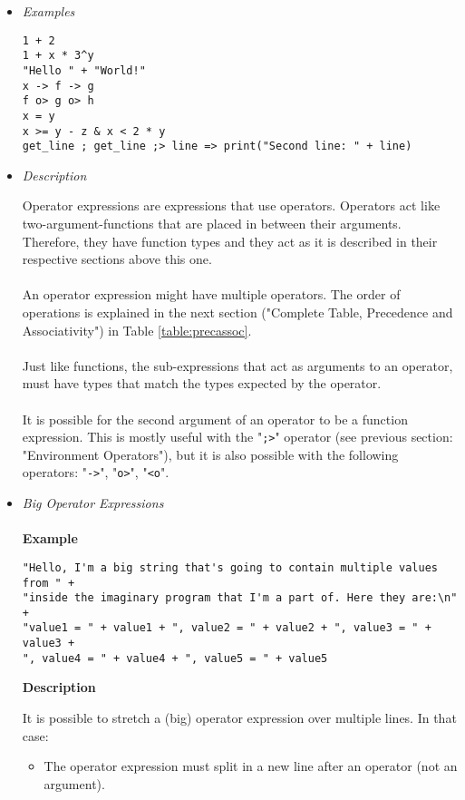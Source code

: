 \documentclass{article}
\begin{document}
\begin{itemize}
\item \textit{Examples}
\begin{verbatim}
1 + 2
1 + x * 3^y
"Hello " + "World!"
x -> f -> g
f o> g o> h
x = y
x >= y - z & x < 2 * y
get_line ; get_line ;> line => print("Second line: " + line)
\end{verbatim}

\item \textit{Description}

Operator expressions are expressions that use operators. Operators act like
two-argument-functions that are placed in between their arguments. Therefore,
they have function types and they act as it is described in their respective
sections above this one.
\\\\
An operator expression might have multiple operators. The order of operations
is explained in the next section ("Complete Table, Precedence and Associativity")
in Table \ref{table:precassoc}.
\\\\
Just like functions, the sub-expressions
that act as arguments to an operator, must have types that match the types 
expected by the operator.
\\\\
It is possible for the second argument of an operator to be a function expression.
This is mostly useful with the "\texttt{;>}" operator (see previous section:
"Environment Operators"), but it is also possible with the following operators:
"\texttt{->}", "\texttt{o>}", "\texttt{<o}".

\item \textit{Big Operator Expressions}\\\\
\textbf{Example}

\begin{verbatim}
"Hello, I'm a big string that's going to contain multiple values from " +
"inside the imaginary program that I'm a part of. Here they are:\n" +
"value1 = " + value1 + ", value2 = " + value2 + ", value3 = " + value3 + 
", value4 = " + value4 + ", value5 = " + value5
\end{verbatim}

\textbf{Description}

It is possible to stretch a (big) operator expression over multiple lines.
In that case:
\begin{itemize}
\item
The operator expression must split in a new line after an operator (not an
argument).


\end{itemize}
\end{itemize}
\end{document}
